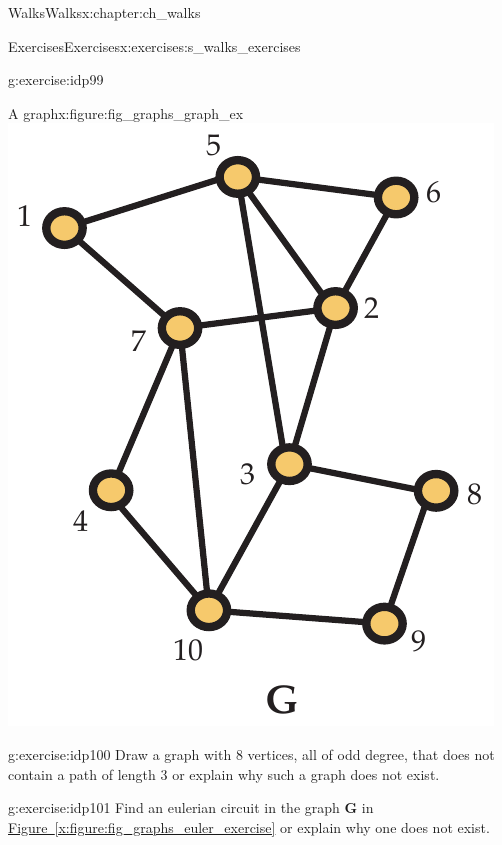 \documentclass[oneside,10pt,]{book}
\newcommand{\xreffont}{\relax}
\numberwithin{equation}{section}
\newcommand{\bfG}{\mathbf{G}}
\begin{document}
\begin{chapterptx}{Walks}{}{Walks}{}{}{x:chapter:ch_walks}
\begin{exercises-section}{Exercises}{}{Exercises}{}{}{x:exercises:s_walks_exercises}
\begin{divisionexercise}{1}{}{}{g:exercise:idp99}
\begin{sidebyside}{2}{0.0125}{0.0125}{0.025}
\begin{sbspanel}{0.6}
\begin{enumerate}[label=(\alph*)]
\end{enumerate}
\end{sbspanel}%
\begin{sbspanel}{0.35}%
\begin{figureptx}{A graph}{x:figure:fig_graphs_graph_ex}{}%
\includegraphics[width=\linewidth]{images/graph_ex}
\tcblower
\end{figureptx}%
\end{sbspanel}%
\end{sidebyside}%
\end{divisionexercise}%
\begin{divisionexercise}{2}{}{}{g:exercise:idp100}%
Draw a graph with \(8\) vertices, all of odd degree, that does not contain a path of length \(3\) or explain why such a graph does not exist.%
\end{divisionexercise}%
\begin{divisionexercise}{3}{}{}{g:exercise:idp101}%
Find an eulerian circuit in the graph \(\bfG\) in \hyperref[x:figure:fig_graphs_euler_exercise]{Figure~{\xreffont\ref{x:figure:fig_graphs_euler_exercise}}} or explain why one does not exist.%

\end{divisionexercise}
\end{exercises-section}
\end{chapterptx}
\end{document}
